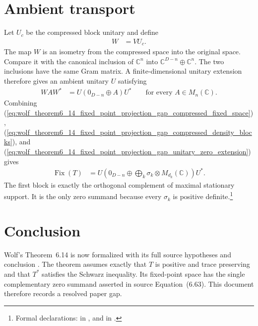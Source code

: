 \documentclass{article}
\begin{document}
\section{Ambient transport}

Let $U_c$ be the compressed block unitary and define
\begin{align}
  W
    &=VU_c.
  \label{eq:wolf_theorem6_14_fixed_point_projection_gap_compressed_isometry}
\end{align}
The map $W$ is an isometry from the compressed space into the original space.
Compare it with the canonical inclusion of $\mathbb C^n$ into
$\mathbb C^{D-n}\oplus\mathbb C^n$. The two inclusions have the same Gram
matrix. A finite-dimensional unitary extension therefore gives an ambient
unitary $U$ satisfying
\begin{align}
  WAW^*
    &=U(0_{D-n}\oplus A)U^*
    \qquad\text{for every }A\in M_n(\mathbb C).
  \label{eq:wolf_theorem6_14_fixed_point_projection_gap_unitary_zero_extension}
\end{align}
Combining
(\ref{eq:wolf_theorem6_14_fixed_point_projection_gap_compressed_fixed_space}),
(\ref{eq:wolf_theorem6_14_fixed_point_projection_gap_compressed_density_blocks}),
and
(\ref{eq:wolf_theorem6_14_fixed_point_projection_gap_unitary_zero_extension})
gives
\begin{align}
  \operatorname{Fix}(T)
    &=U\left(0_{D-n}\oplus
      \bigoplus_k\sigma_k\otimes M_{d_k}(\mathbb C)\right)U^*.
  \label{eq:wolf_theorem6_14_fixed_point_projection_gap_ambient_fixed_space}
\end{align}
The first block is exactly the orthogonal complement of maximal stationary
support. It is the only zero summand because every $\sigma_k$ is positive
definite.\footnote{Formal declarations:
 in
, and
 in
.}

\section{Conclusion}

Wolf's Theorem~6.14 is now formalized with its full source hypotheses and
conclusion \cite[Theorem~6.14]{Wolf2012Quantum}. The theorem assumes exactly
that $T$ is positive and trace preserving and that $T^*$ satisfies the Schwarz
inequality. Its fixed-point space has the single complementary zero summand
asserted in source Equation~(6.63). This document therefore records a resolved
paper gap.



\end{document}
